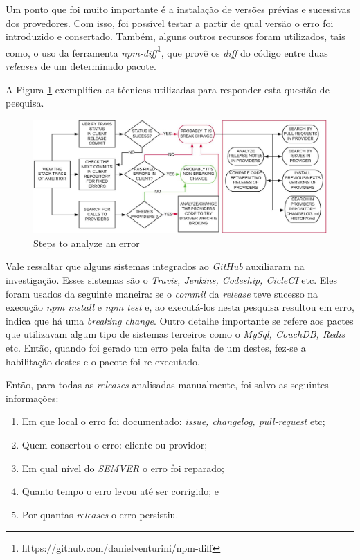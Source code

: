 Um ponto que foi muito importante é a instalação de versões prévias e sucessivas dos provedores. Com isso, foi possível testar a partir de qual versão o erro foi introduzido e consertado. Também, alguns outros recursos foram utilizados, tais como, o uso da ferramenta \textit{npm-diff}\footnote{https://github.com/danielventurini/npm-diff}, que provê os \textit{diff} do código entre duas \textit{releases} de um determinado pacote.

A Figura \ref{fig:step_analyze} exemplifica as técnicas utilizadas para responder esta questão de pesquisa.

\begin{figure}
    \centering
    \includegraphics[scale=0.35]{figuras/step_analyze.jpeg}
    \caption{Steps to analyze an error}
    \label{fig:step_analyze}
\end{figure}

Vale ressaltar que alguns sistemas integrados ao \textit{GitHub} auxiliaram na investigação. Esses sistemas são o \textit{Travis, Jenkins, Codeship, CicleCI} etc. Eles foram usados da seguinte maneira: se o \textit{commit} da \textit{release} teve sucesso na execução \textit{npm install} e \textit{npm test} e, ao executá-los nesta pesquisa resultou em erro, indica que há uma \textit{breaking change}. Outro detalhe importante se refere aos pactes que utilizavam algum tipo de sistemas terceiros como o \textit{MySql, CouchDB, Redis} etc. Então, quando foi gerado um erro pela falta de um destes, fez-se a habilitação destes e o pacote foi re-executado.

Então, para todas as \textit{releases} analisadas manualmente, foi salvo as seguintes informações:

\begin{enumerate}
    \item Em que local o erro foi documentado: \textit{issue, changelog, pull-request} etc;
    \item Quem consertou o erro: cliente ou providor;
    \item Em qual nível do \textit{SEMVER} o erro foi reparado;
    \item Quanto tempo o erro levou até ser corrigido; e
    \item Por quantas \textit{releases} o erro persistiu.
\end{enumerate}{}

